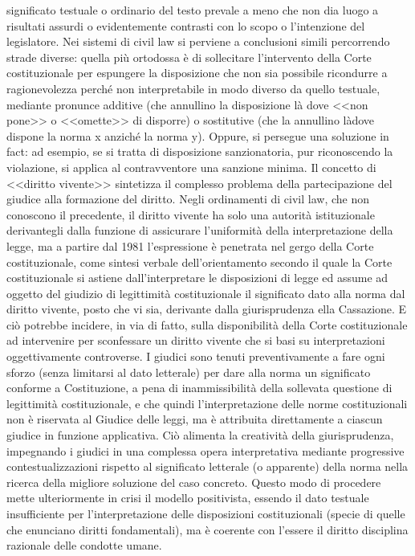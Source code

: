 significato testuale o ordinario del testo prevale a meno che non dia luogo a risultati assurdi o evidentemente contrasti con lo scopo o l'intenzione del legislatore. Nei sistemi di civil law si perviene a conclusioni simili percorrendo strade diverse: quella più ortodossa è di sollecitare l'intervento della Corte costituzionale per espungere la disposizione che non sia possibile ricondurre a ragionevolezza perché non interpretabile in modo diverso da quello testuale, mediante pronunce additive (che annullino la disposizione là dove <<non pone>> o <<omette>> di disporre) o sostitutive (che la annullino làdove dispone la norma x anziché la norma y). Oppure, si persegue una soluzione in fact: ad esempio, se si tratta di disposizione sanzionatoria, pur riconoscendo la violazione, si applica al contravventore una sanzione minima. Il concetto di <<diritto vivente>> sintetizza il complesso problema della partecipazione del giudice alla formazione del diritto. Negli ordinamenti di civil law, che non conoscono il precedente, il diritto vivente ha solo una autorità istituzionale derivantegli dalla funzione di assicurare l'uniformità della interpretazione della legge, ma a partire dal 1981 l'espressione è penetrata nel gergo della Corte costituzionale, come sintesi verbale dell'orientamento secondo il quale la Corte costituzionale si astiene dall'interpretare le disposizioni di legge ed assume ad oggetto del giudizio di legittimità costituzionale il significato dato alla norma dal diritto vivente, posto che vi sia, derivante dalla giurisprudenza ella Cassazione. E ciò potrebbe incidere, in via di fatto, sulla disponibilità della Corte costituzionale ad intervenire per sconfessare un diritto vivente che si basi su interpretazioni oggettivamente controverse. I giudici sono tenuti preventivamente a fare ogni sforzo (senza limitarsi
al dato letterale) per dare alla norma un significato conforme a Costituzione, a pena di
inammissibilità della sollevata questione di legittimità costituzionale, e che quindi l'interpretazione delle norme costituzionali non è riservata al Giudice delle leggi, ma è attribuita direttamente a ciascun giudice in funzione applicativa. Ciò alimenta la creatività della giurisprudenza, impegnando i giudici in una complessa opera interpretativa mediante progressive contestualizzazioni rispetto al significato letterale (o apparente) della norma nella ricerca della migliore soluzione del caso concreto. Questo modo di procedere mette ulteriormente in crisi il modello positivista, essendo il dato testuale insufficiente per l'interpretazione delle disposizioni costituzionali (specie di quelle che enunciano diritti fondamentali), ma è coerente con l'essere il diritto disciplina razionale delle condotte umane.

